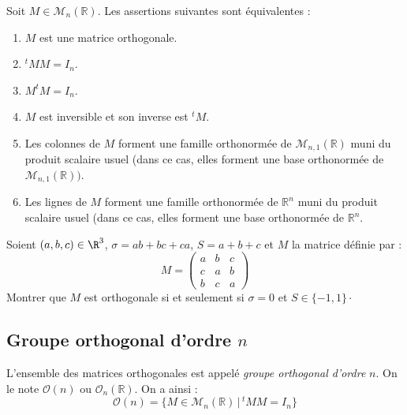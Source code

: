 \documentclass[french,11pt,twoside]{VcCours}
\begin{document}
\begin{Proposition}{} Soit $M \in \mathcal{M}_n(\mathbb{R})$. Les assertions suivantes sont équivalentes :
\begin{enumerate}
\item $M$ est une matrice orthogonale.
\item $^tM M=I_n$.
\item $M ^tM=I_n$.
\item $M$ est inversible et son inverse est $^tM$.
\item Les colonnes de $M$ forment une famille orthonormée de $\mathcal{M}_{n,1}(\mathbb{R})$ muni du produit scalaire usuel (dans ce cas, elles forment une base orthonormée de $\mathcal{M}_{n,1}(\mathbb{R}))$.
\item Les lignes de $M$ forment une famille orthonormée de $\mathbb{R}^n$ muni du produit scalaire usuel (dans ce cas, elles forment une base orthonormée de $\mathbb{R}^n$.
\end{enumerate}
\end{Proposition}

\begin{Demonstration}{}

\vspace*{8.5cm}
\end{Demonstration}

\begin{ApplicationDirecte}{} Soient $(a,b,c) \in \R^{3}$, $\sigma = ab + bc + ca$, $S = a + b + c$ et $M$ la matrice définie par :
  \[
  M =
  \begin{pmatrix}
    a & b & c \\
    c & a & b \\
    b & c & a
  \end{pmatrix}
  \]
Montrer que $M$ est orthogonale si et seulement si  $\sigma = 0$ et $S \in \lbrace -1,1 \rbrace\cdot$
\end{ApplicationDirecte}
 
\subsection{Groupe orthogonal d'ordre \texorpdfstring{$n$}{n}}

\begin{Definition}{} L'ensemble des matrices orthogonales est appelé \emph{groupe orthogonal d'ordre} $n$. On le note $\mathcal{O}(n)$ ou $\mathcal{O}_n(\mathbb{R})$. On a ainsi :
$$ \mathcal{O}(n) = \lbrace M \in \mathcal{M}_n(\mathbb{R}) \, \vert \, ^tM M=I_n \rbrace$$
\end{Definition}
\end{document}
